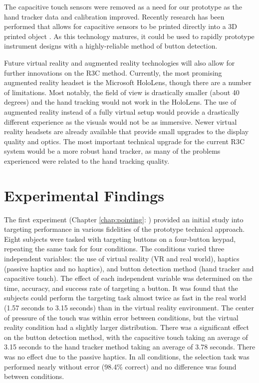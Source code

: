 The capacitive touch sensors were removed as a need for our prototype as the hand tracker data and calibration improved.
Recently research has been performed that allows for capacitive sensors to be printed directly into a 3D printed object \citep{shemelya_3d_2013,kwok_electrically_2017}.
As this technology matures, it could be used to rapidly prototype instrument designs with a highly-reliable method of button detection.

Future virtual reality and augmented reality technologies will also allow for further innovations on the R3C method.
Currently, the most promising augmented reality headset is the Microsoft HoloLens, though there are a number of limitations.
Most notably, the field of view is drastically smaller (about 40 degrees) and the hand tracking would not work in the HoloLens.
The use of augmented reality instead of a fully virtual setup would provide a drastically different experience as the visuals would not be as immersive.
Newer virtual reality headsets are already available that provide small upgrades to the display quality and optics.
The most important technical upgrade for the current R3C system would be a more robust hand tracker, as many of the problems experienced were related to the hand tracking quality.



\section{Experimental Findings}

The first experiment (Chapter \ref{chap:pointing}: ) provided an initial study into targeting performance in various fidelities of the prototype technical approach.
Eight subjects were tasked with targeting buttons on a four-button keypad, repeating the same task for four conditions.
The conditions varied three independent variables: the use of virtual reality (VR and real world), haptics (passive haptics and no haptics), and button detection method (hand tracker and capacitive touch).
The effect of each independent variable was determined on the time, accuracy, and success rate of targeting a button.
It was found that the subjects could perform the targeting task almost twice as fast in the real world (1.57 seconds to 3.15 seconds) than in the virtual reality environment.
The center of pressure of the touch was within error between conditions, but the virtual reality condition had a slightly larger distribution.
There was a significant effect on the button detection method, with the capacitive touch taking an average of 3.15 seconds to the hand tracker method taking an average of 3.78 seconds.
There was no effect due to the passive haptics.
In all conditions, the selection task was performed nearly without error (98.4\% correct) and no difference was found between conditions.

